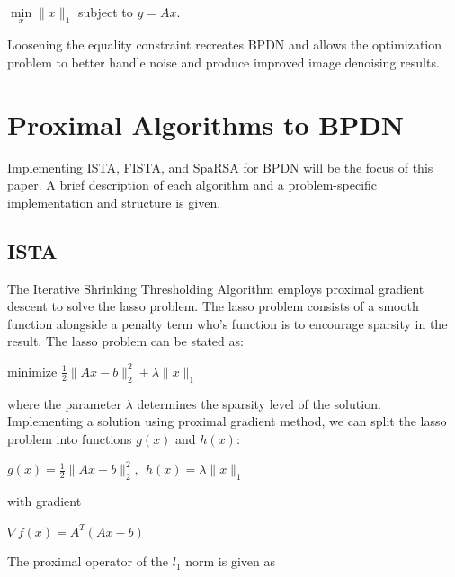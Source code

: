 \documentclass[10pt]{article} %
\begin{document}
\begin{center}
    $ \underset{x}{\min} \|x\|_1$ subject to $y=Ax$.
\end{center}

Loosening the equality constraint recreates BPDN and allows the optimization problem to better handle noise and produce improved image denoising results. 

\vspace{\baselineskip}

\section{Proximal Algorithms to BPDN}

Implementing ISTA, FISTA, and SpaRSA for BPDN will be the focus of this paper. A brief description of each algorithm and a problem-specific implementation and structure is given.

\vspace{\baselineskip}

\subsection{ISTA}

The Iterative Shrinking Thresholding Algorithm employs proximal gradient descent to solve the lasso problem. The lasso problem consists of a smooth function alongside a penalty term who's function is to encourage sparsity in the result. The lasso problem can be stated as:

\begin{center}
    minimize $\frac{1}{2} \|Ax-b\|_2^2 + \lambda \|x\|_1$    
\end{center}

where the parameter $\lambda$ determines the sparsity level of the solution. Implementing a solution using proximal gradient method, we can split the lasso problem into functions $g(x)$ and $h(x)$:

\begin{center}
    $g(x) = \frac{1}{2} \|Ax-b\|_2^2, \ \ h(x) = \lambda \|x\|_1$
\end{center}

\noindent with gradient 

\begin{center}
    $\nabla f(x) = A^T(Ax-b)$
\end{center}

\noindent The proximal operator of the $l_1$ norm is given as 
\end{document}
